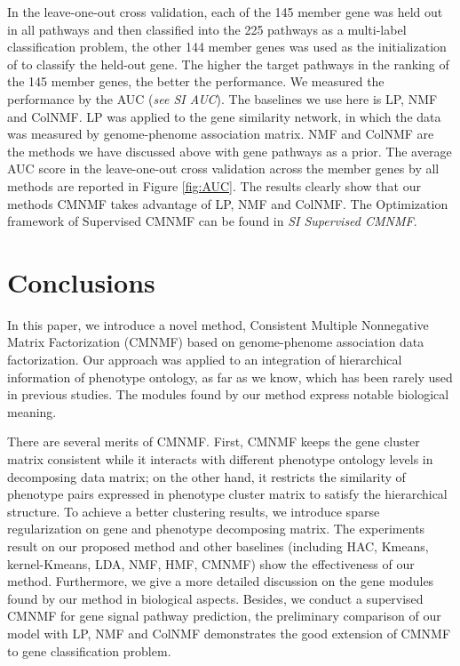 \documentclass{bmcart}
\begin{document}
 In the leave-one-out cross validation, each of the 145 member gene was held out in all pathways and then classified into the 225 pathways as a multi-label classification problem, the other 144 member genes was used as the initialization of to classify the held-out gene. The higher the target pathways in the ranking of the 145 member genes, the better the performance. We measured the performance by the AUC (\emph{see SI AUC}). The baselines we use here is LP, NMF and ColNMF. LP was applied to the gene similarity network, in which the data was measured by genome-phenome association matrix. NMF and ColNMF are the methods we have discussed above with gene pathways as a prior. The average AUC score in the leave-one-out cross validation across the  member genes by all methods are reported in Figure \ref{fig:AUC}. The results clearly show that our methods CMNMF takes advantage of LP, NMF and ColNMF. The Optimization framework of Supervised CMNMF can be found in {\emph{SI Supervised CMNMF}}.

\section*{Conclusions}

In this paper, we introduce a novel method, Consistent Multiple Nonnegative Matrix Factorization (CMNMF) based on genome-phenome association data factorization. Our approach was applied to an integration of hierarchical information of phenotype ontology, as far as we know, which has been rarely used in previous studies. The modules found by our method express notable biological meaning.

There are several merits of CMNMF. First, CMNMF keeps the gene cluster matrix consistent while it interacts with different phenotype ontology levels in decomposing data matrix; on the other hand, it restricts the similarity of phenotype pairs expressed in phenotype cluster matrix to satisfy the hierarchical structure. To achieve a better clustering results, we introduce sparse regularization on gene and phenotype decomposing matrix. The experiments result on our proposed method and other baselines (including HAC, Kmeans, kernel-Kmeans, LDA, NMF, HMF, CMNMF) show the effectiveness of our method. Furthermore, we give a more detailed discussion on the gene modules found by our method in biological aspects. Besides, we conduct a supervised CMNMF for gene signal pathway prediction, the preliminary comparison of our model with LP, NMF and ColNMF demonstrates the good extension of CMNMF to gene classification problem.
\end{document}
